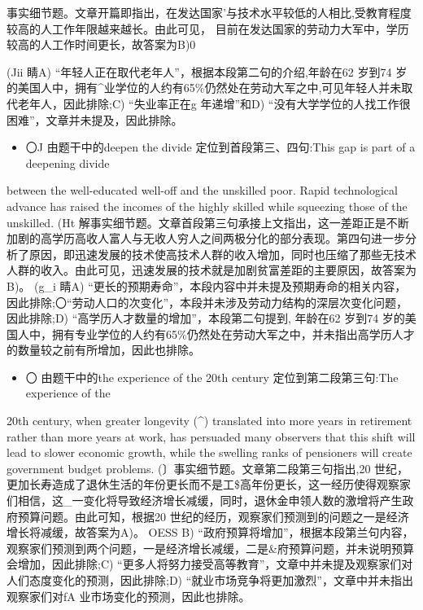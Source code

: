 \documentclass[UTF8,11pt]{ctexart}
\begin{document}
事实细节题。文章开篇即指出，在发达国家’与技术水平较低的人相比,受教育程度较高的人工作年限越来越长。由此可见， 目前在发达国家的劳动力大军中，学历较高的人工作时间更长，故答案为B)0


(Jii 睛A) “年轻人正在取代老年人”，根据本段第二句的介绍,年龄在62 岁到74 岁的美国人中，拥有\textasciicircum{}业学位的人约有65\%仍然处在劳动大军之中,可见年轻人并未取代老年人，因此排除;C) “失业率正在g 年递增”和D) “没有大学学位的人找工作很困难”，文章并未提及，因此排除。


\begin{itemize}[leftmargin=2em,itemsep=.2em,topsep=.4em]\item[B.] 〇J 由题干中的deepen the divide 定位到首段第三、四句:This gap is part of a deepening divide
\end{itemize}

between the well-educated well-off and the unskilled poor. Rapid technological advance has raised the incomes of the highly skilled while squeezing those of the unskilled. (Ht 解事实细节题。文章首段第三句承接上文指出，这一差距正是不断加剧的高学历高收人富人与无收人穷人之间两极分化的部分表现。第四句进一步分析了原因，即迅速发展的技术使高技术人群的收入增加，同时也压缩了那些无技术人群的收入。由此可见，迅速发展的技术就是加剧贫富差距的主要原因，故答案为B)。 (g\_i 睛A) “更长的预期寿命”，本段内容中并未提及预期寿命的相关内容，因此排除;〇“劳动人口的次变化”，本段并未涉及劳动力结构的深层次变化问题，因此排除;D) “高学历人才数量的增加”，本段第二句提到, 年龄在62 岁到74 岁的美国人中，拥有专业学位的人约有65\%仍然处在劳动大军之中，并未指出高学历人才的数量较之前有所增加，因此也排除。


\begin{itemize}[leftmargin=2em,itemsep=.2em,topsep=.4em]\item[A.] 〇 由题干中的the experience of the 20th century 定位到第二段第三句:The experience of the
\end{itemize}

20th century, when greater longevity (\textasciicircum{}) translated into more years in retirement rather than more years at work, has persuaded many observers that this shift will lead to slower economic growth, while the swelling ranks of pensioners will create government budget problems. (〕事实细节题。文章第二段第三句指出,20 世纪，更加长寿造成了退休生活的年份更长而不是工\$高年份更长，这一经历使得观察家们相信，这\_一变化将导致经济增长减缓，同时，退休金申领人数的激增将产生政府预算问题。由此可知，根据20 世纪的经历，观察家们预测到的问题之一是经济增长将减缓，故答案为A)。 OESS B) “政府预算将增加”，根据本段第兰句内容，观察家们预测到两个问题，一是经济增长减缓，二是\&府预算问题，并未说明预算会增加，因此排除;C) “更多人将努力接受高等教育”，文章中并未提及观察家们对人们态度变化的预测，因此排除;D) “就业市场竞争将更加激烈”，文章中并未指出观察家们对fA 业市场变化的预测，因此也排除。
\end{document}
